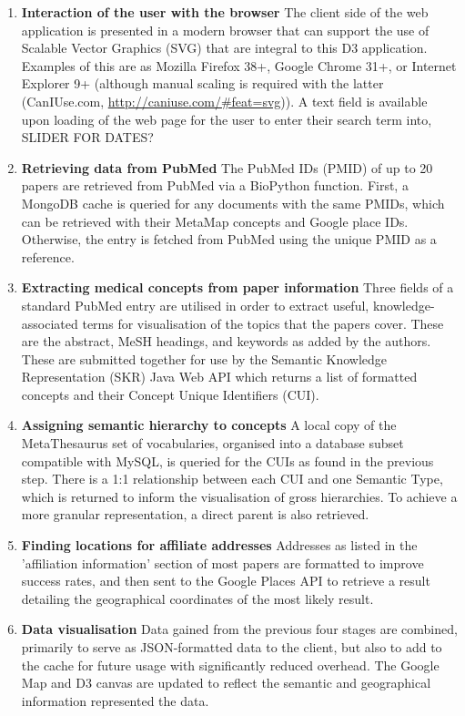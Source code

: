\documentclass[Report.tex]{subfiles}
\begin{document}
\begin{enumerate}
\item{\textbf{Interaction of the user with the browser}} 
\newline The client side of the web application is presented in a modern browser that can support the use of Scalable Vector Graphics (SVG) that are integral to this D3 application. Examples of this are as Mozilla Firefox 38+, Google Chrome 31+, or Internet Explorer 9+ (although manual scaling is required with the latter (CanIUse.com, \url{http://caniuse.com/#feat=svg})). A text field is available upon loading of the web page for the user to enter their search term into, SLIDER FOR DATES?
\item{\textbf{Retrieving data from PubMed}}
\newline The PubMed IDs (PMID) of up to 20 papers are retrieved from PubMed via a BioPython function\cite{biopython}. First, a MongoDB cache is queried for any documents with the same PMIDs, which can be retrieved with their MetaMap concepts and Google place IDs. Otherwise, the entry is fetched from PubMed using the unique PMID as a reference. 
\item{\textbf{Extracting medical concepts from paper information}}
\newline Three fields of a standard PubMed entry are utilised in order to extract useful, knowledge-associated terms for visualisation of the topics that the papers cover. These are the abstract, MeSH headings, and keywords as added by the authors. These are submitted together for use by the Semantic Knowledge Representation (SKR) Java Web API which returns a list of formatted concepts and their Concept Unique Identifiers (CUI).
\item{\textbf{Assigning semantic hierarchy to concepts}}
\newline A local copy of the MetaThesaurus set of vocabularies, organised into a database subset compatible with MySQL, is queried for the CUIs as found in the previous step. There is a 1:1 relationship between each CUI and one Semantic Type, which is returned to inform the visualisation of gross hierarchies. To achieve a more granular representation, a direct parent is also retrieved.
\item{\textbf{Finding locations for affiliate addresses}}
\newline Addresses as listed in the 'affiliation information' section of most papers are formatted to improve success rates, and then sent to the Google Places API to retrieve a result detailing the geographical coordinates of the most likely result.
\item{\textbf{Data visualisation}}
\newline Data gained from the previous four stages are combined, primarily to serve as JSON-formatted data to the client, but also to add to the cache for future usage with significantly reduced overhead. The Google Map and D3 canvas are updated to reflect the semantic and geographical information represented the data.
\end{enumerate}
\end{document}

